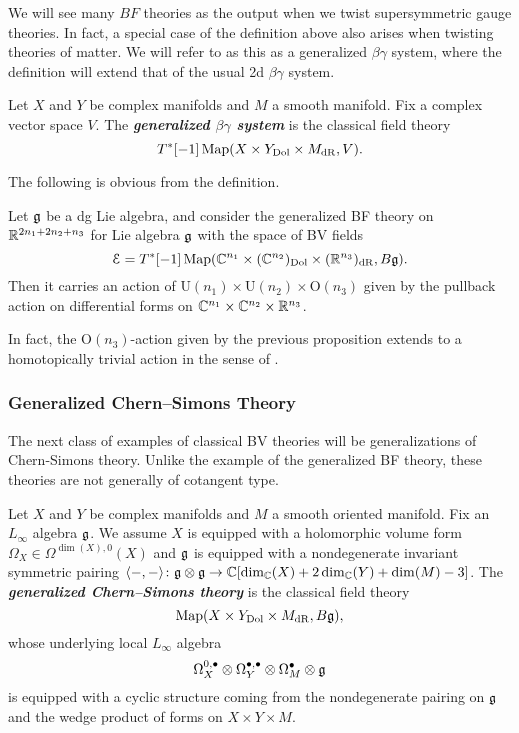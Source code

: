 \documentclass[10pt, oneside]{article}
\renewcommand{\U}{\mathrm{U}}
\newcommand{\defterm}[1]{\textbf{\emph{#1}}}
\begin{document}
We will see many $BF$ theories as the output when we twist supersymmetric gauge theories.
In fact, a special case of the definition above also arises when twisting theories of matter.  We will refer to as this as a generalized $\beta\gamma$ system, where the definition will extend that of the usual 2d $\beta \gamma$ system. 

\begin{definition}
Let $X$ and $Y$ be complex manifolds and $M$ a smooth manifold. Fix a complex vector space $V$. The \defterm{generalized $\beta\gamma$ system} is the classical field theory
\[T^*[-1]\operatorname{Map}(X\times Y_{\mathrm{Dol}}\times M_{\mathrm{dR}}, V).\]
\end{definition}

The following is obvious from the definition.

\begin{prop}
Let $\mathfrak g$ be a dg Lie algebra, and consider the generalized BF theory on $\mathbb R^{2n_1+2n_2+n_3}$ for Lie algebra $\mathfrak g$ with the space of BV fields
\[\mathcal E = T^*[-1]\operatorname{Map}(\mathbb C^{n_1}\times (\mathbb C^{n_2})_{\mathrm{Dol}}\times (\mathbb R^{n_3})_{\mathrm{dR}}, B\mathfrak g).\]
Then it carries an action of $\U(n_1)\times \U(n_2)\times \mathrm{O}(n_3)$ given by the pullback action on differential forms on $\mathbb C^{n_1}\times \mathbb C^{n_2}\times \mathbb R^{n_3}$.
\label{prop:BFrotationaction}
\end{prop}

\begin{remark}
In fact, the $\mathrm{O}(n_3)$-action given by the previous proposition extends to a homotopically trivial action in the sense of \cite[Section 2.4]{ElliottSafronov}.
\end{remark}

\subsubsection{Generalized Chern--Simons Theory} \label{gen_CS_section}
The next class of examples of classical BV theories will be generalizations of Chern-Simons theory. Unlike the example of the generalized BF theory, these theories are not generally of cotangent type.

\begin{definition}
Let $X$ and $Y$ be complex manifolds and $M$ a smooth oriented manifold. Fix an $L_\infty$ algebra $\mathfrak g$. We assume $X$ is equipped with a holomorphic volume form $\Omega_X \in\Omega^{\dim(X), 0}(X)$ and $\mathfrak g$ is equipped with a nondegenerate invariant symmetric pairing $\langle-, -\rangle\colon \mathfrak g\otimes\mathfrak g\rightarrow \mathbb C[\dim_\mathbb C(X) + 2\dim_\mathbb C(Y) + \dim(M) - 3]$. The \defterm{generalized Chern--Simons theory} is the classical field theory
\[\operatorname{Map}(X\times Y_{\mathrm{Dol}}\times M_{\mathrm{dR}}, B\mathfrak g),\]
whose underlying local $L_\infty$ algebra
\[\Omega^{0,\bullet}_X \otimes \Omega^{\bullet,\bullet}_Y \otimes \Omega^\bullet_M \otimes \mathfrak g\]
is equipped with a cyclic structure coming from the nondegenerate pairing on $\mathfrak g$ and the wedge product of forms on $X\times Y\times M$.
\label{def:generalizedCS}
\end{definition}
\end{document}
